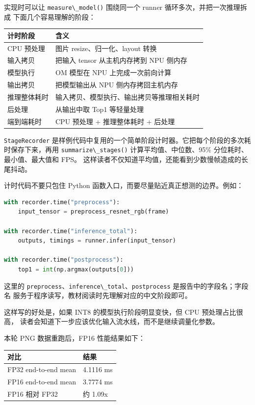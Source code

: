 实现时可以让 \passthrough{\lstinline!measure\_model()!} 围绕同一个
runner 循环多次，并把一次推理拆成 下面几个容易理解的阶段：

\begin{longtable}[]{@{}ll@{}}
\toprule\noalign{}
计时阶段 & 含义 \\
\midrule\noalign{}
\endhead
\bottomrule\noalign{}
\endlastfoot
CPU 预处理 & 图片 resize、归一化、layout 转换 \\
输入拷贝 & 把输入 tensor 从主机内存拷到 NPU 侧内存 \\
模型执行 & OM 模型在 NPU 上完成一次前向计算 \\
输出拷贝 & 把模型输出从 NPU 侧内存拷回主机内存 \\
推理整体耗时 & 输入拷贝、模型执行、输出拷贝等推理相关耗时 \\
后处理 & 从输出中取 Top1 等轻量处理 \\
端到端耗时 & CPU 预处理 + 推理整体耗时 + 后处理 \\
\end{longtable}

\passthrough{\lstinline!StageRecorder!}
是样例代码中复用的一个简单阶段计时器。它把每个阶段的多次耗时保存下来，再用
\passthrough{\lstinline!summarize\_stages()!} 计算平均值、中位数、95\%
分位耗时、最小值、最大值和 FPS。
这样读者不仅知道平均值，还能看到少数慢帧造成的长尾抖动。

计时代码不要只包住 Python 函数入口，而要尽量贴近真正想测的边界。例如：

\begin{lstlisting}[language=Python]
with recorder.time("preprocess"):
    input_tensor = preprocess_resnet_rgb(frame)

with recorder.time("inference_total"):
    outputs, timings = runner.infer(input_tensor)

with recorder.time("postprocess"):
    top1 = int(np.argmax(outputs[0]))
\end{lstlisting}

这里的
\passthrough{\lstinline!preprocess!}、\passthrough{\lstinline!inference\_total!}、\passthrough{\lstinline!postprocess!}
是报告中的字段名；字段名
服务于程序读写，教材阅读时先理解对应的中文阶段即可。

这样写的好处是，如果 INT8 的模型执行阶段明显变快，但 CPU
预处理占比很高，
读者会知道下一步应该优化输入流水线，而不是继续调量化参数。

本轮 PNG 数据重跑后，FP16 性能结果如下：

\begin{longtable}[]{@{}ll@{}}
\toprule\noalign{}
对比 & 结果 \\
\midrule\noalign{}
\endhead
\bottomrule\noalign{}
\endlastfoot
FP32 end-to-end mean & 4.1116 ms \\
FP16 end-to-end mean & 3.7774 ms \\
FP16 相对 FP32 & 约 1.09x \\
\end{longtable}

